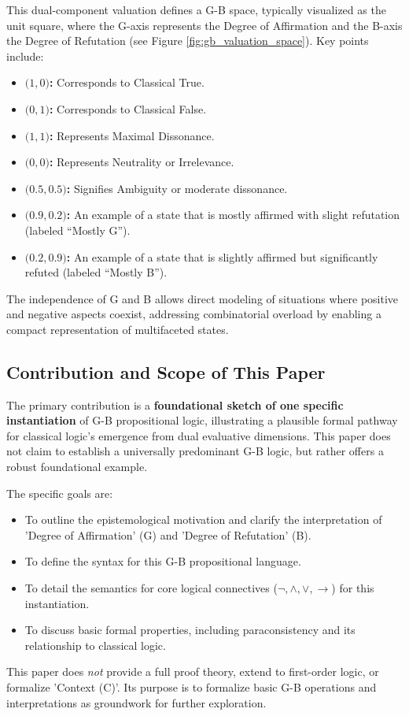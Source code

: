 \documentclass[11pt]{article}
\newcommand{\GB}[2]{\bigl(#1,#2\bigr)} %
\theoremstyle{remark}
\begin{document}
This dual-component valuation defines a G-B space, typically visualized as the unit square, where the G-axis represents the Degree of Affirmation and the B-axis the Degree of Refutation (see Figure \ref{fig:gb_valuation_space}). Key points include:
\begin{itemize}
    \item \textbf{$\GB{1}{0}$:} Corresponds to Classical True.
    \item \textbf{$\GB{0}{1}$:} Corresponds to Classical False.
    \item \textbf{$\GB{1}{1}$:} Represents Maximal Dissonance.
    \item \textbf{$\GB{0}{0}$:} Represents Neutrality or Irrelevance.
    \item \textbf{$\GB{0.5}{0.5}$:} Signifies Ambiguity or moderate dissonance.
    \item \textbf{$\GB{0.9}{0.2}$:} An example of a state that is mostly affirmed with slight refutation (labeled ``Mostly G'').
    \item \textbf{$\GB{0.2}{0.9}$:} An example of a state that is slightly affirmed but significantly refuted (labeled ``Mostly B'').
\end{itemize}
The independence of G and B allows direct modeling of situations where positive and negative aspects coexist, addressing combinatorial overload by enabling a compact representation of multifaceted states.

\subsection{Contribution and Scope of This Paper}
The primary contribution is a \textbf{foundational sketch of one specific instantiation} of G-B propositional logic, illustrating a plausible formal pathway for classical logic's emergence from dual evaluative dimensions. This paper does not claim to establish a universally predominant G-B logic, but rather offers a robust foundational example.

The specific goals are:
\begin{itemize}
    \item To outline the epistemological motivation and clarify the interpretation of 'Degree of Affirmation' (G) and 'Degree of Refutation' (B).
    \item To define the syntax for this G-B propositional language.
    \item To detail the semantics for core logical connectives ($\neg, \land, \lor, \rightarrow$) for this instantiation.
    \item To discuss basic formal properties, including paraconsistency and its relationship to classical logic.
\end{itemize}
This paper does \textit{not} provide a full proof theory, extend to first-order logic, or formalize 'Context (C)'. Its purpose is to formalize basic G-B operations and interpretations as groundwork for further exploration.
\end{document}
